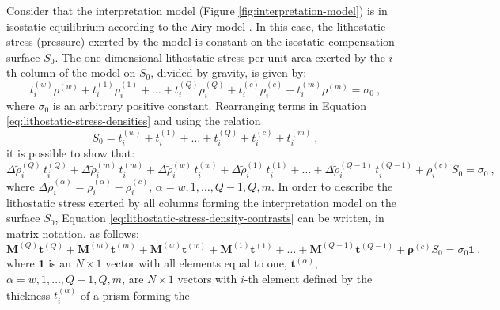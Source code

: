 \documentclass[manuscript]{geophysics}
\begin{document}
Consider that the interpretation model (Figure \ref{fig:interpretation-model}) is in
isostatic equilibrium according to the Airy model \citep{turcotte-schubert2002,
hofmann-wellenhof-moritz2005, lowrie2007}.
In this case, the lithostatic stress (pressure) exerted by the model is constant on the
isostatic compensation surface $S_{0}$. The one-dimensional lithostatic stress per unit
area exerted by the $i$-th column of the model on $S_{0}$, divided by gravity, 
is given by:
\begin{equation}
t^{(w)}_{i} \rho^{(w)} + t^{(1)}_{i} \rho^{(1)}_{i} + \dots + 
t^{(Q)}_{i} \rho^{(Q)}_{i} + t^{(c)}_{i} \rho^{(c)}_{i} + t^{(m)}_{i} \rho^{(m)} 
= \sigma_{0} \: ,
\label{eq:lithostatic-stress-densities}
\end{equation}
where $\sigma_{0}$ is an arbitrary positive constant. Rearranging terms in Equation
\ref{eq:lithostatic-stress-densities} and using the relation
\begin{equation}
S_{0} = t^{(w)}_{i} + t^{(1)}_{i} + \dots + t^{(Q)}_{i} + t^{(c)}_{i} + t^{(m)}_{i} \: ,
\label{eq:S0}
\end{equation}
it is possible to show that:
\begin{equation}
\Delta \tilde{\rho}^{(Q)}_{i} \, t^{(Q)}_{i} + 
\Delta \tilde{\rho}^{(m)}_{i} \, t^{(m)}_{i} + 
\Delta \tilde{\rho}^{(w)}_{i} \, t^{(w)}_{i} + 
\Delta \tilde{\rho}^{(1)}_{i} \, t^{(1)}_{i} +
\dots + 
\Delta \tilde{\rho}^{(Q-1)}_{i} \, t^{(Q-1)}_{i} +
\rho^{(c)}_{i} \, S_{0} = \sigma_{0} \: ,
\label{eq:lithostatic-stress-density-contrasts}
\end{equation}
where $\Delta \tilde{\rho}^{(\alpha)}_{i} = \rho^{(\alpha)}_{i} - \rho^{(c)}_{i}$, 
$\alpha = w, 1, \dots, Q-1, Q, m$.
In order to describe the lithostatic stress exerted by all columns forming the
interpretation model on the surface $S_{0}$, Equation
\ref{eq:lithostatic-stress-density-contrasts} can be written, in matrix notation, as
follows:
\begin{equation}
\mathbf{M}^{(Q)} \mathbf{t}^{(Q)} + \mathbf{M}^{(m)} \mathbf{t}^{(m)} + \mathbf{M}^{(w)}
\mathbf{t}^{(w)} + \mathbf{M}^{(1)} \mathbf{t}^{(1)} + \dots + \mathbf{M}^{(Q-1)}
\mathbf{t}^{(Q-1)} + \boldsymbol{\rho}^{(c)} S_{0} = \sigma_{0} \mathbf{1} \: ,
\label{eq:lithostatic-stress-matrix}
\end{equation}
where $\mathbf{1}$ is an $N \times 1$ vector with all elements equal to one, 
$\mathbf{t}^{(\alpha)}$, $\alpha = w, 1, \dots, Q-1, Q, m$, are $N \times 1$ vectors
with $i$-th element defined by the thickness $t^{(\alpha)}_{i}$ of a prism forming the
\end{document}
